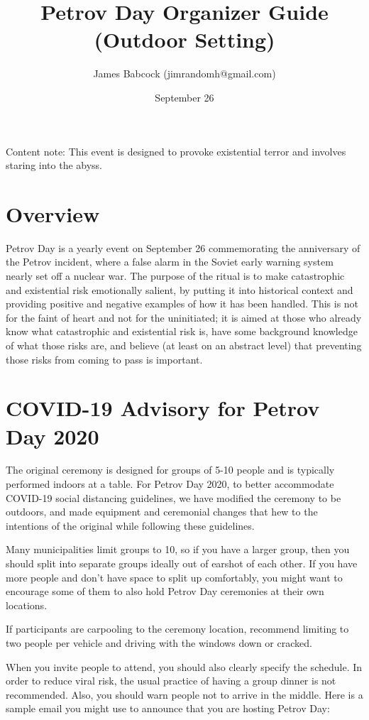 \documentclass{article}
\title{Petrov Day Organizer Guide (Outdoor Setting)}
\author{James Babcock (jimrandomh@gmail.com)}
\date{September 26}
\begin{document}
\maketitle

Content note: This event is designed to provoke existential terror and involves
staring into the abyss.

\section{Overview}

Petrov Day is a yearly event on September 26 commemorating the anniversary of
the Petrov incident, where a false alarm in the Soviet early warning system
nearly set off a nuclear war. The purpose of the ritual is to make catastrophic
and existential risk emotionally salient, by putting it into historical context
and providing positive and negative examples of how it has been handled. This
is not for the faint of heart and not for the uninitiated; it is aimed at those
who already know what catastrophic and existential risk is, have some
background knowledge of what those risks are, and believe (at least on an
abstract level) that preventing those risks from coming to pass is important.

\section{COVID-19 Advisory for Petrov Day 2020}

The original ceremony is designed for groups of 5-10 people and is typically
performed indoors at a table. For Petrov Day 2020, to better accommodate
COVID-19 social distancing guidelines, we have modified the ceremony to be
outdoors, and made equipment and ceremonial changes that hew to the intentions
of the original while following these guidelines.

Many municipalities limit groups to 10, so if you have a larger group, then
you should split into separate groups ideally out of earshot of each other. If
you have more people and don't have space to split up comfortably, you might
want to encourage some of them to also hold Petrov Day ceremonies at their own
locations.

If participants are carpooling to the ceremony location, recommend limiting to
two people per vehicle and driving with the windows down or cracked.

When you invite people to attend, you should also clearly specify the
schedule. In order to reduce viral risk, the usual practice of having a group
dinner is not recommended. Also, you should warn people not to arrive in the
middle. Here is a sample email you might use to announce that you are hosting
Petrov Day:
\end{document}
